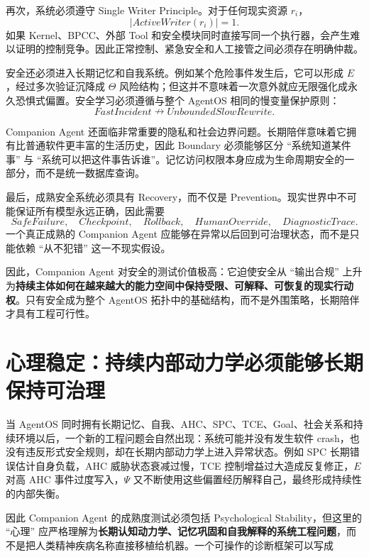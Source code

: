 再次，系统必须遵守 Single Writer Principle。对于任何现实资源 $r_i$，
\[
\left|
ActiveWriter(r_i)
\right|
=1.
\]
如果 Kernel、BPCC、外部 Tool 和安全模块同时直接写同一个执行器，会产生难以证明的控制竞争。因此正常控制、紧急安全和人工接管之间必须存在明确仲裁。

安全还必须进入长期记忆和自我系统。例如某个危险事件发生后，它可以形成 $E$，经过多次验证沉降成 $\Theta$ 风险结构；但这并不意味着一次意外就应无限强化成永久恐惧式偏置。安全学习必须遵循与整个 AgentOS 相同的慢变量保护原则：
\[
FastIncident
\nrightarrow
UnboundedSlowRewrite.
\]

Companion Agent 还面临非常重要的隐私和社会边界问题。长期陪伴意味着它拥有比普通软件更丰富的生活历史，因此 Boundary 必须能够区分 ``系统知道某件事'' 与 ``系统可以把这件事告诉谁''。记忆访问权限本身应成为生命周期安全的一部分，而不是统一数据库查询。

最后，成熟安全系统必须具有 Recovery，而不仅是 Prevention。现实世界中不可能保证所有模型永远正确，因此需要
\[
SafeFailure
,\quad
Checkpoint
,\quad
Rollback
,\quad
HumanOverride
,\quad
DiagnosticTrace.
\]
一个真正成熟的 Companion Agent 应能够在异常以后回到可治理状态，而不是只能依赖 ``从不犯错'' 这一不现实假设。

因此，Companion Agent 对安全的测试价值极高：它迫使安全从 ``输出合规'' 上升为\textbf{持续主体如何在越来越大的能力空间中保持受限、可解释、可恢复的现实行动权}。只有安全成为整个 AgentOS 拓扑中的基础结构，而不是外围策略，长期陪伴才具有工程可行性。

\section{心理稳定：持续内部动力学必须能够长期保持可治理}

当 AgentOS 同时拥有长期记忆、自我、AHC、SPC、TCE、Goal、社会关系和持续环境以后，一个新的工程问题会自然出现：系统可能并没有发生软件 crash，也没有违反形式安全规则，却在长期内部动力学上进入异常状态。例如 SPC 长期错误估计自身负载，AHC 威胁状态衰减过慢，TCE 控制增益过大造成反复修正，$E$ 对高 AHC 事件过度写入，$\Psi$ 又不断使用这些偏置经历解释自己，最终形成持续性的内部失衡。

因此 Companion Agent 的成熟度测试必须包括 Psychological Stability，但这里的 ``心理'' 应严格理解为\textbf{长期认知动力学、记忆巩固和自我解释的系统工程问题}，而不是把人类精神疾病名称直接移植给机器。一个可操作的诊断框架可以写成
\begin{statementbox}
\centering
{}
\end{statementbox}

